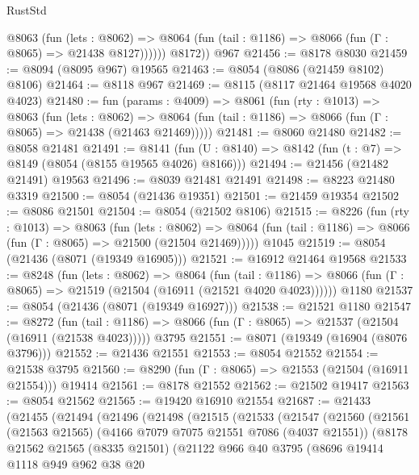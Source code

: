 \begin{lexlean}{RustStd}
\begin{coremodule}
            @8063
              (fun (lets : @8062) =>
              @8064 (fun (tail : @1186) => @8066 (fun (Γ : @8065) => @21438 @8127))))))
        @8172))
    @967
@21456 := @8178 @8030
@21459 := @8094 (@8095 @967) @19565
@21463 := @8054 (@8086 (@21459 @8102) @8106)
@21464 := @8118 @967
@21469 := @8115 (@8117 @21464 @19568 @4020 @4023)
@21480 := fun (params : @4009) =>
  @8061
    (fun (rty : @1013) =>
    @8063
      (fun (lets : @8062) =>
      @8064 (fun (tail : @1186) => @8066 (fun (Γ : @8065) => @21438 (@21463 @21469)))))
@21481 := @8060 @21480
@21482 := @8058 @21481
@21491 := @8141
    (fun (U : @8140) => @8142 (fun (t : @7) => @8149 (@8054 (@8155 @19565 @4026) @8166)))
@21494 := @21456 (@21482 @21491) @19563
@21496 := @8039 @21481 @21491
@21498 := @8223 @21480 @3319
@21500 := @8054 (@21436 @19351)
@21501 := @21459 @19354
@21502 := @8086 @21501
@21504 := @8054 (@21502 @8106)
@21515 := @8226
    (fun (rty : @1013) =>
    @8063
      (fun (lets : @8062) =>
      @8064 (fun (tail : @1186) => @8066 (fun (Γ : @8065) => @21500 (@21504 @21469)))))
    @1045
@21519 := @8054 (@21436 (@8071 (@19349 @16905)))
@21521 := @16912 @21464 @19568
@21533 := @8248
    (fun (lets : @8062) =>
    @8064
      (fun (tail : @1186) =>
      @8066 (fun (Γ : @8065) => @21519 (@21504 (@16911 (@21521 @4020 @4023))))))
    @1180
@21537 := @8054 (@21436 (@8071 (@19349 @16927)))
@21538 := @21521 @1180
@21547 := @8272
    (fun (tail : @1186) => @8066 (fun (Γ : @8065) => @21537 (@21504 (@16911 (@21538 @4023)))))
    @3795
@21551 := @8071 (@19349 (@16904 (@8076 @3796)))
@21552 := @21436 @21551
@21553 := @8054 @21552
@21554 := @21538 @3795
@21560 := @8290 (fun (Γ : @8065) => @21553 (@21504 (@16911 @21554))) @19414
@21561 := @8178 @21552
@21562 := @21502 @19417
@21563 := @8054 @21562
@21565 := @19420 @16910 @21554
@21687 := @21433
    (@21455
      (@21494
        (@21496
          (@21498
            (@21515
              (@21533
                (@21547
                  (@21560
                    (@21561
                      (@21563 @21565)
                      (@4166 @7079 @7075 @21551 @7086 (@4037 @21551))
                      (@8178
                        @21562
                        @21565
                        (@8335 @21501)
                        (@21122
                          @966
                          @40
                          @3795
                          (@8696
                            @19414
                            @1118
                            @949
                            @962
                            @38
                            @20

\end{coremodule}
\end{lexlean}
